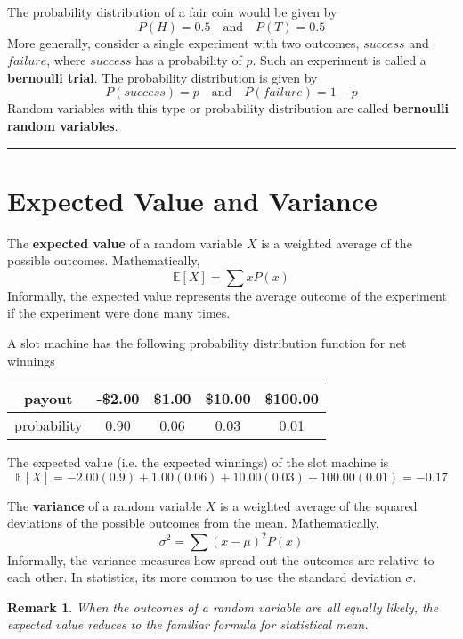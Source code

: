 \documentclass{article}
\newtheorem*{remark}{Remark}
\theoremstyle{definition}
\newcommand{\secend}[0]{\noindent\rule[0.5ex]{\linewidth}{1pt}}
\newcommand{\mand}[0]{\quad\text{and}\quad}
\begin{document}
\noindent The probability distribution of a fair coin would be given by
\[
    P(H) = 0.5 \mand P(T) = 0.5
\]
More generally, consider a single experiment with two outcomes, $success$ and
$failure$, where $success$ has a probability of $p$. Such an experiment is
called a \textbf{bernoulli trial}. The probability distribution is given by
\[
    P(success) = p \mand P(failure) = 1-p
\]
Random variables with this type or probability distribution are called
\textbf{bernoulli random variables}. \\
\secend

\section*{Expected Value and Variance}
\begin{definition}
    The \textbf{expected value} of a random variable $X$ is a weighted average of
    the possible outcomes. Mathematically,
    \[
        \mathbb{E}[X] = \sum x P(x)
    \]
    Informally, the expected value represents the average outcome of the
    experiment if the experiment were done many times.
\end{definition}

\noindent A slot machine has the following probability distribution function for
net winnings
\begin{center}
    \begin{tabular}{|c|c|c|c|c|}
        \hline
        payout & -\$2.00 & \$1.00 & \$10.00 &  \$100.00 \\\hline
        probability & 0.90 & 0.06 & 0.03 & 0.01 \\\hline
    \end{tabular}
\end{center}
\noindent The expected value (i.e. the expected winnings) of the slot machine is
\[
    \mathbb{E}[X] = -2.00(0.9) + 1.00(0.06) + 10.00(0.03) + 100.00(0.01) = -0.17
\]

\begin{definition}
    The \textbf{variance} of a random variable $X$ is a weighted average of the
    squared deviations of the possible outcomes from the mean. Mathematically, 
    \[
        \sigma^2 = \sum (x-\mu)^2 P(x)
    \]
    Informally, the variance measures how spread out the outcomes are relative
    to each other. In statistics, its more common to use the standard
    deviation $\sigma$.
\end{definition}

\begin{remark}
    When the outcomes of a random variable are all equally likely, the expected
    value reduces to the familiar formula for statistical mean.
\end{remark}
\end{document}
